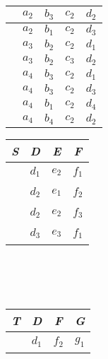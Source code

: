 \documentclass[UTF8]{ctexart}
\begin{document}
\begin{itemize}
\begin{table}
{\begin{minipage}{0.35\textwidth}
\begin{tabular}{|c|c|c|c|c|}
					 & $a_{2}$ & $b_{3}$ & $c_{2}$ & $d_{2}$\\\hline	
					 					 
					 & $a_{2}$ & $b_{1}$ & $c_{2}$ & $d_{3}$\\\hline	
					 					 
					 & $a_{3}$ & $b_{2}$ & $c_{2}$ & $d_{1}$\\\hline	
					 					 
					 & $a_{3}$ & $b_{2}$ & $c_{3}$ & $d_{2}$\\\hline	
					 					 
					 & $a_{4}$ & $b_{3}$ & $c_{2}$ & $d_{1}$\\\hline	
					 					 
					 & $a_{4}$ & $b_{3}$ & $c_{2}$ & $d_{3}$\\\hline	
					 					 
					 & $a_{4}$ & $b_{1}$ & $c_{2}$ & $d_{4}$\\\hline	
					 				 
					 & $a_{4}$ & $b_{4}$ & $c_{2}$ & $d_{2}$\\\hline	
					  
				\end{tabular}
			\end{minipage}
			\hfil
			\begin{minipage}{0.35\textwidth}
				
				\begin{tabular}{|c|c|c|c|}       \hline
					\textit{S} & \textit{D} & \textit{E} & \textit{F}     \\\hline
					~ & $d_{1}$ & $e_{2}$ & $f_{1}$ \\\hline
					
					~ & $d_{2}$ & $e_{1}$ & $f_{2}$ \\\hline
					
					~ & $d_{2}$ & $e_{2}$ & $f_{3}$ \\\hline
					
					~ & $d_{3}$ & $e_{3}$ & $f_{1}$ \\\hline
				\end{tabular}
			\\
			\\
			\\
			
				\begin{tabular}{|c|c|c|c|}       \hline
					\textit{T} & \textit{D} & \textit{F} & \textit{G}     \\\hline
					~ & $d_{1}$ & $f_{2}$ & $g_{1}$ \\\hline
					

\end{tabular}
\end{minipage}}
\end{table}
\end{itemize}
\end{document}
